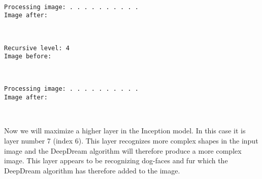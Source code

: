 \documentclass[11pt]{article}
\begin{document}
    \begin{center}
    \end{center}
    { \hspace*{\fill} \\}
    
    \begin{Verbatim}[commandchars=\\\{\}]
Processing image: . . . . . . . . . . 
Image after:

    \end{Verbatim}

    \begin{center}
    \end{center}
    { \hspace*{\fill} \\}
    
    \begin{Verbatim}[commandchars=\\\{\}]
Recursive level: 4
Image before:

    \end{Verbatim}

    \begin{center}
    \end{center}
    { \hspace*{\fill} \\}
    
    \begin{Verbatim}[commandchars=\\\{\}]
Processing image: . . . . . . . . . . 
Image after:

    \end{Verbatim}

    \begin{center}
    \end{center}
    { \hspace*{\fill} \\}
    
    Now we will maximize a higher layer in the Inception model. In this case
it is layer number 7 (index 6). This layer recognizes more complex
shapes in the input image and the DeepDream algorithm will therefore
produce a more complex image. This layer appears to be recognizing
dog-faces and fur which the DeepDream algorithm has therefore added to
the image.
\end{document}
